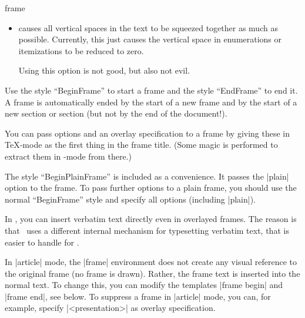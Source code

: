 \begin{environment}{{frame}%
    }
\begin{frame}[<+->][plain]
\begin{frame}[plain]
\begin{itemize}
    The best way to use this option is to identify frames that are
    overly full, but in which all text absolutely has to be fit on a
    single frame. Then start specifying first |shrink=5|, then
    |shrink=10|, and so on, until no warning is issued any more (or
    just ignore the warning when things look satisfactory).

    Using this option is \emph{very evil}. It will
    result in changes of the font size from slide to slide, which is a
    typographic nightmare. Its usage can \emph{always} be avoided by
    restructuring and simplifying frames, which will result in a
    better presentation.

    \example
\begin{verbatim}
\begin{frame}[shrink=5]
  Some evil endless slide that is 5\% too large.
\end{frame}
\end{verbatim}
  \item
     causes all vertical spaces in the text to be
    squeezed together as much as possible. Currently, this just causes
    the vertical space in enumerations or itemizations to be reduced
    to zero.

    Using this option is not good, but also not evil.   
  \end{itemize}

  \lyxnote
  Use the style ``BeginFrame'' to start a frame and the style
  ``EndFrame'' to end it. A frame is automatically ended by the start
  of a new frame and by the start of a new section or section (but
  not by the end of the document!).

  \lyxnote
  You can pass options and an overlay specification to a frame by
  giving these in \TeX-mode as the first thing in the frame
  title. (Some magic is performed to extract them in \LyX-mode from
  there.)

  \lyxnote
  The style ``BeginPlainFrame'' is included as a convenience. It
  passes the |plain| option to the frame. To pass further options to a
  plain frame, you should use the normal ``BeginFrame'' style and
  specify all options (including |plain|).

  \lyxnote
  In \LyX, you can insert verbatim text directly even in overlayed
  frames. The reason is that \LyX\ uses a different internal mechanism
  for typesetting verbatim text, that is easier to handle for \beamer.

  \articlenote
  In |article| mode, the |frame| environment does not create any visual
  reference to the original frame (no frame is drawn). Rather, the
  frame text is inserted into the normal text. To change this, you can
  modify the templates |frame begin| and |frame end|, see below. To
  suppress a frame in |article| mode, you can, for example, specify
  |<presentation>| as overlay specification.


\end{frame}
\end{frame}
\end{environment}
